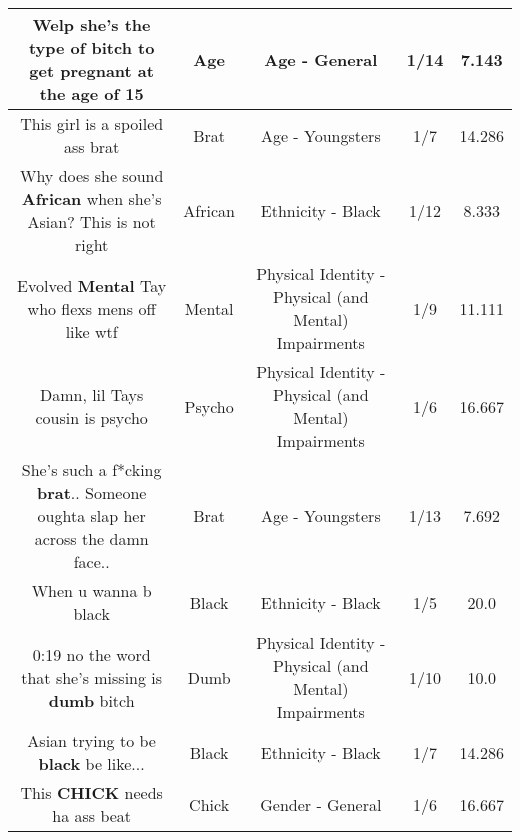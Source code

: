 \documentclass[11pt]{article}
\newlength\mylength
\begin{document}
\begin{center}
\begin{longtable}{|C{.65\mylength}|C{.30\mylength}|C{.12\mylength}|C{.12\mylength}|C{.12\mylength}|}
  \small Welp she's the type of bitch to get pregnant at the \textbf{age} of 15\normalsize   & Age & Age - General & 1/14 & 7.143 \\  \hline
  \small This girl is a spoiled ass brat\normalsize   & Brat & Age - Youngsters & 1/7 & 14.286 \\  \hline
  \small Why does she sound \textbf{African} when she's Asian? This is not right\normalsize   & African & Ethnicity - Black & 1/12 & 8.333 \\  \hline
  \small Evolved \textbf{Mental} Tay who flexs mens off like wtf\normalsize   & Mental & Physical Identity - Physical (and Mental) Impairments & 1/9 & 11.111 \\  \hline
  \small Damn, lil Tays cousin is psycho\normalsize   & Psycho & Physical Identity - Physical (and Mental) Impairments & 1/6 & 16.667 \\  \hline
  \small She's such a f*cking \textbf{brat}.. Someone oughta slap her across the damn face..\normalsize   & Brat & Age - Youngsters & 1/13 & 7.692 \\  \hline
  \small When u wanna b black\normalsize   & Black & Ethnicity - Black & 1/5 & 20.0 \\  \hline
  \small 0:19 no the word that she's missing is \textbf{dumb} bitch\normalsize   & Dumb & Physical Identity - Physical (and Mental) Impairments & 1/10 & 10.0 \\  \hline
  \small Asian trying to be \textbf{black} be like...\normalsize   & Black & Ethnicity - Black & 1/7 & 14.286 \\  \hline
  \small This \textbf{CHICK} needs ha ass beat\normalsize   & Chick & Gender - General & 1/6 & 16.667 \\  \hline

\end{longtable}
\end{center}
\end{document}
